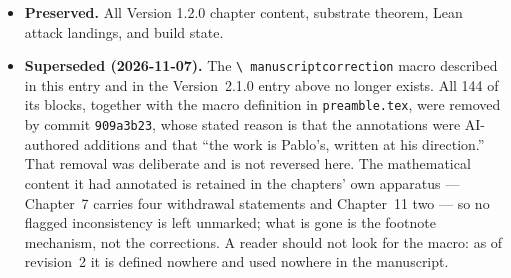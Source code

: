 \begin{itemize}
\texttt{\textbackslash pageref}.
\item \textbf{Preserved.} All Version 1.2.0 chapter content,
substrate theorem, Lean attack landings, and build state.
\item \textbf{Superseded (2026-11-07).} The \texttt{\textbackslash
manuscriptcorrection} macro described in this entry and in the Version~2.1.0
entry above no longer exists. All 144 of its blocks, together with the macro
definition in \texttt{preamble.tex}, were removed by commit
\texttt{909a3b23}, whose stated reason is that the annotations were
AI-authored additions and that ``the work is Pablo's, written at his
direction.'' That removal was deliberate and is not reversed here. The
mathematical content it had annotated is retained in the chapters' own
apparatus --- Chapter~7 carries four withdrawal statements and Chapter~11 two
--- so no flagged inconsistency is left unmarked; what is gone is the footnote
mechanism, not the corrections. A reader should not look for the macro: as of
revision~2 it is defined nowhere and used nowhere in the manuscript.
\end{itemize}

